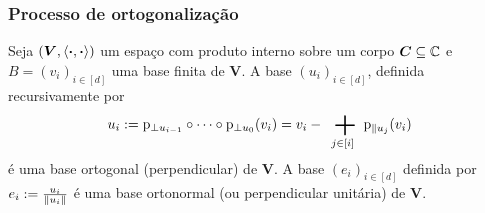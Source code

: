 \begin{comment}
Podemos também decompor um vetor $v$ com relação a um conjunto finito $U$ como
	\begin{equation*}
	v = \proj_{\parallel U}(v) + \proj_{\perp U}(v).
	\end{equation*}
em que
	\begin{align*}
	\func{\proj_{\parallel U}}{V}{V}{v}{\sum_{u \in U}\proj_{\parallel u}(v)}
	\end{align*}
	\begin{align*}
	\func{\proj_{\perp U}}{V}{V}{v}{v-\proj_{\parallel U}(v)}.
	\end{align*}

Isso é o mesmo que dizer que
	\begin{equation*}
	\proj_{\parallel U} = \sum_{u \in U} \proj_{\parallel u}
	\end{equation*}
e
	\begin{equation*}
	\proj_{\perp U} = \Id - \proj_{\parallel U}.
	\end{equation*}

Notemos que, para todo $v \in V$ e todo $u \in U$,
	\begin{equation*}
	\proj_{\perp U}(v) \perp u
	\end{equation*}
pois
	\begin{align*}
	\inte{\proj_{\perp U} (v)}{u} &= \inte{v-\proj_{\parallel U}(v)}{u} \\
		&= \inte{v - \sum_{u \in U}\proj_{\parallel u}(v)}{u} \\
		&= \inte{v}{u} - \sum_{u \in U} \inte{\proj_{\parallel u}(v)}{u} \\
	\end{align*}

\end{comment}


\subsubsection{Processo de ortogonalização}

Seja $(\bm V,\left\langle{\bm{\cdot}},{\bm{\cdot}}\right\rangle)$ um espaço com produto interno sobre um corpo $\bm C \subseteq \mathbb{C}$ e $B = (v_i)_{i \in [d]}$ uma base finita de $\bm V$. A base $(u_i)_{i \in [d]}$, definida recursivamente por
	\begin{equation*}
	u_i := \proj_{\perp u_{i-1}} \circ \cdots \circ \proj_{\perp u_0} (v_i) =  v_i - \sum_{j \in [i]} \proj_{\parallel u_j} (v_i)
	\end{equation*}
é uma base ortogonal (perpendicular) de $\bm V$. A base $(e_i)_{i \in [d]}$ definida por $e_i := \frac{u_i}{\left\Vert{u_i}\right\Vert}$ é uma base ortonormal (ou perpendicular unitária) de $\bm V$.


